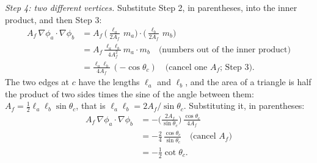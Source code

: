 \emph{Step 4: two different vertices.} Substitute Step 2, in parentheses, into the inner product, and then Step 3:
\begin{align*}
A_f\, \nabla \phi_a \cdot \nabla \phi_b &= A_f\, \Big(\frac{\ell_a}{2A_f}\, m_a\Big)\cdot\Big(\frac{\ell_b}{2A_f}\, m_b\Big) \\
&= A_f\, \frac{\ell_a \ell_b}{4 A_f^2}\, m_a\cdot m_b \quad \text{(numbers out of the inner product)}\\
&= \frac{\ell_a \ell_b}{4 A_f}\,(-\cos\theta_c) \quad \text{(cancel one } A_f\text{; Step 3)} .
\end{align*}
The two edges at $c$ have the lengths $\ell_a$ and $\ell_b$, and the area of a triangle is half the product of two sides times the sine of the angle between them: $A_f = \frac12 \ell_a \ell_b \sin\theta_c$, that is $\ell_a\ell_b = 2A_f/\sin\theta_c$. Substituting it, in parentheses:
\begin{align*}
A_f\, \nabla \phi_a \cdot \nabla \phi_b &= -\Big(\frac{2 A_f}{\sin\theta_c}\Big)\,\frac{\cos\theta_c}{4 A_f} \\
&= -\frac{2}{4}\,\frac{\cos\theta_c}{\sin\theta_c} \quad \text{(cancel } A_f\text{)}\\
&= -\frac12 \cot \theta_c .
\end{align*}


